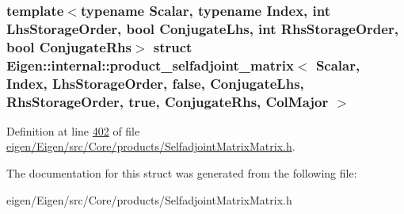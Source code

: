 \subsubsection*{template$<$typename Scalar, typename Index, int Lhs\+Storage\+Order, bool Conjugate\+Lhs, int Rhs\+Storage\+Order, bool Conjugate\+Rhs$>$\newline
struct Eigen\+::internal\+::product\+\_\+selfadjoint\+\_\+matrix$<$ Scalar, Index, Lhs\+Storage\+Order, false, Conjugate\+Lhs, Rhs\+Storage\+Order, true, Conjugate\+Rhs, Col\+Major $>$}



Definition at line \hyperlink{eigen_2_eigen_2src_2_core_2products_2_selfadjoint_matrix_matrix_8h_source_l00402}{402} of file \hyperlink{eigen_2_eigen_2src_2_core_2products_2_selfadjoint_matrix_matrix_8h_source}{eigen/\+Eigen/src/\+Core/products/\+Selfadjoint\+Matrix\+Matrix.\+h}.



The documentation for this struct was generated from the following file\+:\begin{DoxyCompactItemize}
\item 
eigen/\+Eigen/src/\+Core/products/\+Selfadjoint\+Matrix\+Matrix.\+h\end{DoxyCompactItemize}

